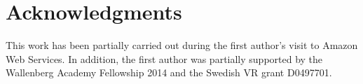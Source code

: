 \section*{Acknowledgments}
\label{sect:aws/acks}
This work has been partially carried out during the first author's visit to Amazon Web Services. In addition, the first author was partially supported by the Wallenberg Academy Fellowship 2014 and the Swedish VR grant D0497701.
